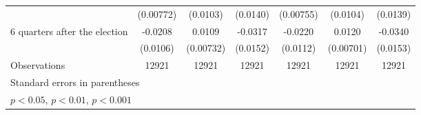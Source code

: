 \begin{table}[!ht]
\begin{tabular}{l*{6}{c}}
                    &   (0.00772)         &    (0.0103)         &    (0.0140)         &   (0.00755)         &    (0.0104)         &    (0.0139)         \\
[1em]
 6 quarters after the election&     -0.0208         &      0.0109         &     -0.0317\sym{*}  &     -0.0220\sym{*}  &      0.0120         &     -0.0340\sym{*}  \\
                    &    (0.0106)         &   (0.00732)         &    (0.0152)         &    (0.0112)         &   (0.00701)         &    (0.0153)         \\
\hline
Observations        &       12921         &       12921         &       12921         &       12921         &       12921         &       12921         \\
\hline\hline
\multicolumn{7}{l}{\footnotesize Standard errors in parentheses}\\
\multicolumn{7}{l}{\footnotesize \sym{*} \(p<0.05\), \sym{**} \(p<0.01\), \sym{***} \(p<0.001\)}\\
\end{tabular}
\end{table}
